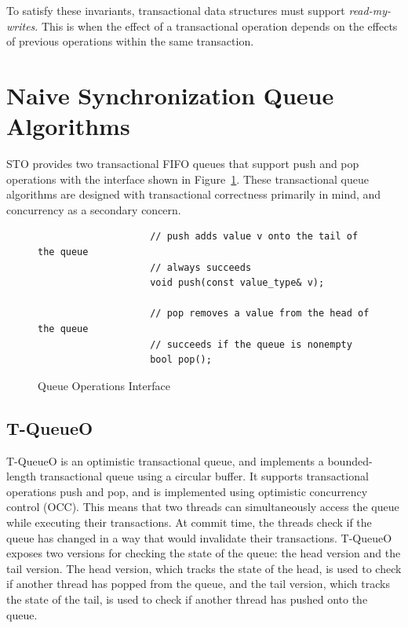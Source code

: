 \noindent
To satisfy these invariants, transactional data structures must support \emph{read-my-writes}. This is when the effect of a transactional operation depends on the effects of previous operations within the same transaction.

\section{Naive Synchronization Queue Algorithms}

STO provides two transactional FIFO queues that support push and pop operations with the interface shown in Figure~\ref{fig:q_interface}. These transactional queue algorithms are designed with transactional correctness primarily in mind, and concurrency as a secondary concern. 

\begin{figure}[t]
    \centering
    \begin{lstlisting}
                    // push adds value v onto the tail of the queue
                    // always succeeds
                    void push(const value_type& v); 
                   
                    // pop removes a value from the head of the queue
                    // succeeds if the queue is nonempty 
                    bool pop();                     
    \end{lstlisting}
    \caption{Queue Operations Interface}
    \label{fig:q_interface}
\end{figure}

\subsection{T-QueueO}
T-QueueO is an optimistic transactional queue, and implements a bounded-length transactional queue using a circular buffer.
It supports transactional operations push and pop, and is implemented using optimistic concurrency control (OCC). This means that two threads can simultaneously access the queue while executing their transactions. At commit time, the threads check if the queue has changed in a way that would invalidate their transactions. T-QueueO exposes two versions for checking the state of the queue: the head version and the tail version. The head version, which tracks the state of the head, is used to check if another thread has popped from the queue, and the tail version, which tracks the state of the tail, is used to check if another thread has pushed onto the queue.

